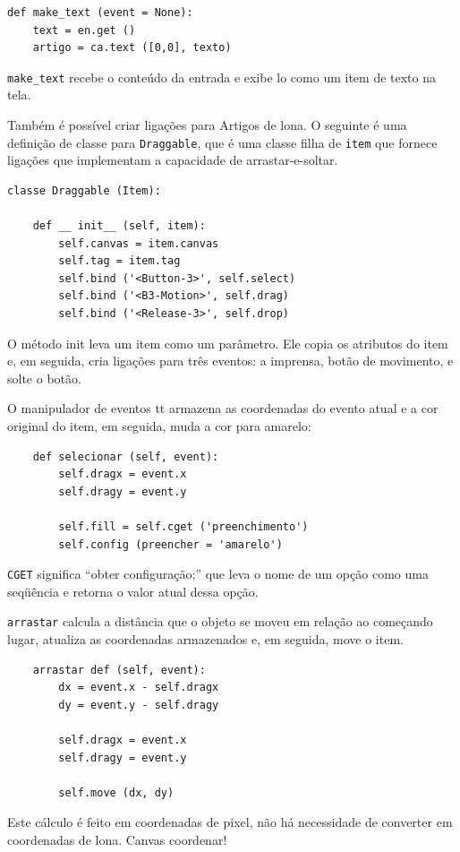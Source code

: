 \documentclass[10pt]{book}
\begin{document}
\begin{exercise}
\begin{v erbatim}
\begin{verbatim}
def make_text (event = None):
    text = en.get ()
    artigo = ca.text ([0,0], texto)
\end{verbatim}
%
\Verb "make_text" recebe o conteúdo da entrada e exibe
lo como um item de texto na tela.

Também é possível criar ligações para Artigos de lona.
O seguinte é uma definição de classe para {\tt Draggable},
que é uma classe filha de {\tt item} que fornece ligações
que implementam a capacidade de arrastar-e-soltar.

\begin{verbatim}
classe Draggable (Item):

    def __ init__ (self, item):
        self.canvas = item.canvas
        self.tag = item.tag
        self.bind ('<Button-3>', self.select)
        self.bind ('<B3-Motion>', self.drag)
        self.bind ('<Release-3>', self.drop)
\end{verbatim}
%
O método init leva um item como um parâmetro. Ele copia
os atributos do item e, em seguida, cria ligações para
três eventos: a imprensa, botão de movimento, e solte o botão.

O manipulador de eventos {\selecionar tt} armazena as coordenadas
do evento atual e a cor original do item, em seguida,
muda a cor para amarelo:

\begin{verbatim}
    def selecionar (self, event):
        self.dragx = event.x
        self.dragy = event.y

        self.fill = self.cget ('preenchimento')
        self.config (preencher = 'amarelo')
\end{verbatim}
%
{\tt CGET} significa ``obter configuração;'' que leva o nome de um
opção como uma seqüência e retorna o valor atual dessa opção.

{\tt arrastar} calcula a distância que o objeto se moveu em relação ao
começando lugar, atualiza as coordenadas armazenados e, em seguida, move o
item.

\begin{verbatim}
    arrastar def (self, event):
        dx = event.x - self.dragx
        dy = event.y - self.dragy

        self.dragx = event.x
        self.dragy = event.y

        self.move (dx, dy)
\end{verbatim}
%
Este cálculo é feito em coordenadas de pixel, não há necessidade de
converter em coordenadas de lona.
{Canvas coordenar!} \Index
{}


\end{v erbatim}
\end{exercise}
\end{document}
